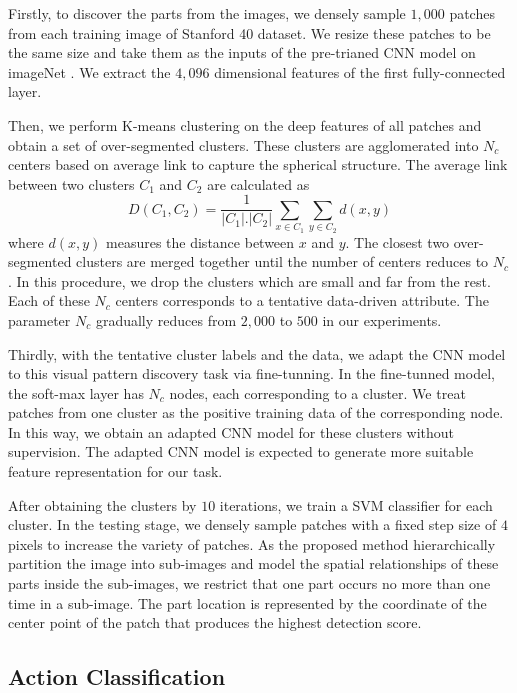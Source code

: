 \documentclass[journal]{IEEEtran}
\begin{document}
Firstly, to discover the parts from the images, we densely sample $ 1,000 $ patches from each training image of Stanford 40 dataset. 
We resize these patches to be the same size and take them as the inputs of the pre-trianed CNN model on imageNet \cite{jia2014caffe}. We extract the $ 4,096 $ dimensional features of the first fully-connected layer.


Then, we perform K-means clustering on the deep features of all patches and obtain a set of over-segmented clusters.  These clusters are agglomerated into $ N_c $ centers based on average link \cite{refine_cluster} to capture the spherical structure. The average link between two clusters \textbf{$ C_1 $} and \textbf{$ C_2 $} are calculated as \begin{equation}\label{Cluster_likn} D(C_1,C_2)=\frac{1}{|C_1|.|C_2|}\underset{x\in C_1}{\sum }\underset{y\in C_2}{\sum }d(x,y) \end{equation}  where $ d(x,y) $ measures the distance between $ x $ and $ y $. The closest two over-segmented clusters are merged together until the number of centers reduces to $ N_c $. In this procedure, we drop the clusters which are small and far from the rest. Each of these $ N_c $ centers corresponds to a tentative data-driven attribute. The parameter $ N_c $ gradually reduces from $ 2,000 $ to $ 500 $ in our experiments.


Thirdly, with the tentative cluster labels and the data, we adapt the CNN model to this visual pattern discovery task via fine-tunning. In the fine-tunned model, the soft-max layer has  $ N_c $ nodes, each corresponding to a cluster. We treat patches from one cluster as the positive training data of the corresponding node. In this way, we obtain an adapted CNN model for these clusters without supervision. The adapted CNN model is expected to generate more suitable feature representation for our task.

After obtaining the clusters by $ 10 $ iterations, we train a SVM classifier for each cluster. In the testing stage, we densely sample patches with a fixed step size of $ 4 $ pixels to increase the variety of patches. As the proposed method hierarchically partition the image into sub-images and model the spatial relationships of these parts inside the sub-images, we restrict that one part occurs no more than one time in a sub-image. The part location is represented by the coordinate of the center point of the patch that produces the highest detection score.

\subsection{Action Classification}
\end{document}
